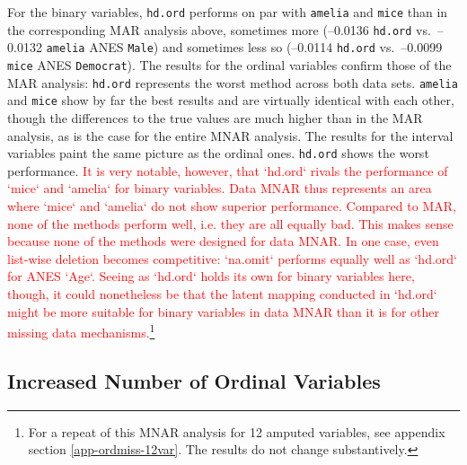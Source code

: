 \documentclass[12pt,econ]{sources/authesis}
\begin{document}
For the binary variables, \texttt{hd.ord} performs on par with \texttt{amelia} and \texttt{mice} than in the corresponding MAR analysis above, sometimes more (--0.0136 \texttt{hd.ord} vs.~--0.0132 \texttt{amelia} ANES \texttt{Male}) and sometimes less so (--0.0114 \texttt{hd.ord} vs.~--0.0099 \texttt{mice} ANES \texttt{Democrat}). The results for the ordinal variables confirm those of the MAR analysis: \texttt{hd.ord} represents the worst method across both data sets. \texttt{amelia} and \texttt{mice} show by far the best results and are virtually identical with each other, though the differences to the true values are much higher than in the MAR analysis, as is the case for the entire MNAR analysis. The results for the interval variables paint the same picture as the ordinal ones. \texttt{hd.ord} shows the worst performance. \textcolor{red}{It is very notable, however, that `hd.ord` rivals the performance of `mice` and `amelia` for binary variables. Data MNAR thus represents an area where `mice` and `amelia` do not show superior performance. Compared to MAR, none of the methods perform well, i.e. they are all equally bad. This makes sense because none of the methods were designed for data MNAR. In one case, even list-wise deletion becomes competitive: `na.omit` performs equally well as `hd.ord` for ANES `Age`. Seeing as `hd.ord` holds its own for binary variables here, though, it could nonetheless be that the latent mapping conducted in `hd.ord` might be more suitable for binary variables in data MNAR than it is for other missing data mechanisms.}\footnote{For a repeat of this MNAR analysis for 12 amputed variables, see appendix section \ref{app-ordmiss-12var}. The results do not change substantively.}

\hypertarget{ordmiss-results-increaseOrd}{%
\subsection{Increased Number of Ordinal Variables}\label{ordmiss-results-increaseOrd}}
\end{document}
